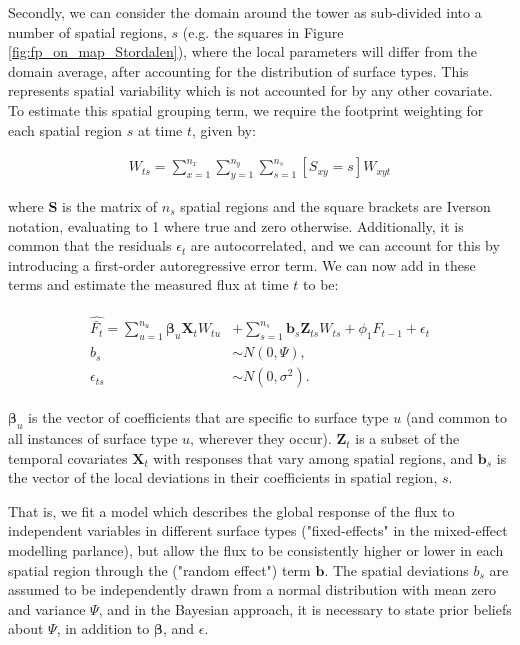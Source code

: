 Secondly, we can consider the domain around the tower as sub-divided into a number of spatial regions, $s$ (e.g. the squares in Figure \ref{fig:fp_on_map_Stordalen}), where the local parameters will differ from the domain average, after accounting for the distribution of surface types. This represents spatial variability which is not accounted for by any other covariate. To estimate this spatial grouping term, we require the footprint weighting for each spatial region $s$ at time $t$, given by:

\begin{align}   \label{eq:sWtMean}
  W_{ts} = \sum_{x = 1}^{n_x} \sum_{y = 1}^{n_y}  \sum_{s = 1}^{n_s} [S_{xy} = s] W_{xyt}
\end{align}

where $\mathbf{S}$ is the matrix of $n_s$ spatial regions and the square brackets are Iverson notation, evaluating to 1 where true and zero otherwise. Additionally, it is common that the residuals $\epsilon_{t}$ are autocorrelated, and we can account for this by introducing a first-order autoregressive error term.
We can now add in these terms and estimate the measured flux at time $t$ to be: 

\begin{align}   \label{eq:pred_Fbarhat}
\begin{split}
  \widehat{\bar{F_t}} = \sum_{u = 1}^{n_u} \boldsymbol{\beta}_u \mathbf{X}_t W_{tu} 
                       &+ \sum_{s = 1}^{n_s} \mathbf{b}_s \mathbf{Z}_{ts} W_{ts} 
                       + \phi_{1}F_{t-1} + \epsilon_{t} \\
  b_s & \sim N(0, \Psi), \\
  \epsilon_{ts} & \sim N(0, \sigma^2).
\end{split}
\end{align}
 
$\boldsymbol{\beta}_u$ is the vector of coefficients that are specific to surface type $u$ (and common to all instances of surface type $u$, wherever they occur).
$\mathbf{Z}_{t}$ is a subset of the temporal covariates $\mathbf{X}_{t}$ with responses that vary among spatial regions,
 and 
$\mathbf{b}_s$ is the vector of the local deviations in their coefficients in spatial region, $s$.

That is, we fit a model which describes the global response of the flux to independent variables in different surface types ("fixed-effects" in the mixed-effect modelling parlance), but allow the flux to be consistently higher or lower in each spatial region through the ("random effect") term $\mathbf{b}$. 
The spatial deviations $b_s$ are assumed to be independently drawn from a normal distribution with mean zero and variance $\Psi$, and in the Bayesian approach, it is necessary to state prior beliefs about $\Psi$, in addition to $\boldsymbol{\beta}$, and $\epsilon$.


